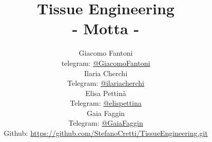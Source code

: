 
\title{\Huge\textbf{Tissue Engineering \\ - Motta -}}
\author{
  Giacomo Fantoni \\
  \small telegram: \href{https://t.me/GiacomoFantoni}{@GiacomoFantoni} \\[3pt]
  Ilaria Cherchi\\
  \small Telegram: \href{https://t.me/ilariacherchi}{@ilariacherchi} \\[3pt]
  Elisa Pettin\`a\\
  \small Telegram: \href{https://t.me/elisapettina}{@elispettina} \\[3pt]
  Gaia Faggin\\
  \small Telegram: \href{https://t.me/GaiaFaggin}{@GaiaFaggin} \\[3pt]
\small Github: \href{https://github.com/StefanoCretti/TissueEngineering.git}{https://github.com/StefanoCretti/TissueEngineering.git}}


\maketitle
\tableofcontents

    
    
    
    
    
    
    
    
    
    


